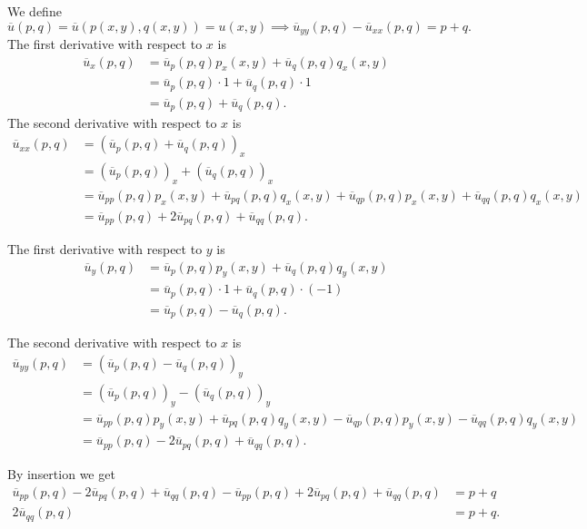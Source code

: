 \begin{derivation}
  We define
  \begin{equation*}
    \overline{u}(p,q) = \overline{u}(p(x,y), q(x,y)) = u(x,y) \implies \overline{u}_{yy}(p,q) - \overline{u}_{x x}(p,q) = p + q
  .\end{equation*}
  The first derivative with respect to $x$ is
  \begin{align*}
    \overline{u}_x(p,q) &= \overline{u}_p(p,q) p_x(x,y) + \overline{u}_q(p,q) q_x(x,y) \\
    &= \overline{u}_p(p,q) \cdot 1 + \overline{u}_q(p,q) \cdot 1 \\
    &= \overline{u}_p(p,q) + \overline{u}_q(p,q)
  .\end{align*}
  The second derivative with respect to $x$ is
  \begin{align*}
    \overline{u}_{x x}(p,q) &= \left( \overline{u}_p(p,q) + \overline{u}_q(p,q) \right)_x \\
    &= \left( \overline{u}_{p}(p,q) \right)_x + \left( \overline{u}_q(p,q) \right)_x \\
    &= \overline{u}_{pp}(p,q) p_x(x,y) + \overline{u}_{pq}(p,q) q_x(x,y) + \overline{u}_{qp}(p,q) p_x(x,y) + \overline{u}_{qq}(p,q) q_x(x,y) \\
    &= \overline{u}_{pp}(p,q) + 2 \overline{u}_{pq}(p,q) + \overline{u}_{qq}(p,q)
  .\end{align*}

  The first derivative with respect to $y$ is
  \begin{align*}
    \overline{u}_y(p,q) &= \overline{u}_p(p,q) p_y(x,y) + \overline{u}_q(p,q) q_y(x,y) \\
    &= \overline{u}_p(p,q) \cdot 1 + \overline{u}_q(p,q) \cdot (-1) \\
    &= \overline{u}_p(p,q) - \overline{u}_q(p,q)
  .\end{align*}

  The second derivative with respect to $x$ is
  \begin{align*}
    \overline{u}_{yy}(p,q) &= \left( \overline{u}_p(p,q) - \overline{u}_q(p,q) \right)_y \\
    &= \left( \overline{u}_{p}(p,q) \right)_y - \left( \overline{u}_q(p,q) \right)_y \\
    &= \overline{u}_{pp}(p,q) p_y(x,y) + \overline{u}_{pq}(p,q) q_y(x,y) - \overline{u}_{qp}(p,q) p_y(x,y) - \overline{u}_{qq}(p,q) q_y(x,y) \\
    &= \overline{u}_{pp}(p,q) - 2 \overline{u}_{pq}(p,q) + \overline{u}_{qq}(p,q)
  .\end{align*}

  By insertion we get
  \begin{align*}
    \overline{u}_{pp}(p,q) - 2 \overline{u}_{pq}(p,q) + \overline{u}_{qq}(p,q) - \overline{u}_{pp}(p,q) + 2 \overline{u}_{pq}(p,q) + \overline{u}_{qq}(p,q) &= p + q \\
    2 \overline{u}_{qq}(p,q) &= p + q
  .\end{align*}
\end{derivation}

